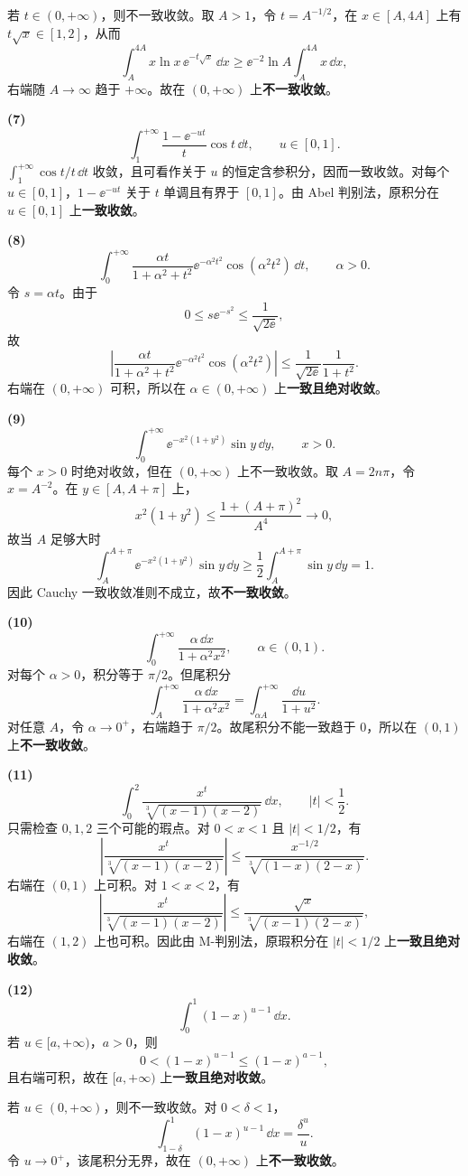 \begin{xsolution}
若 $t\in(0,+\infty)$，则不一致收敛。取 $A>1$，令 $t=A^{-1/2}$，在 $x\in[A,4A]$ 上有 $t\sqrt x\in[1,2]$，从而
\[
\int_A^{4A}x\ln x\,\ee^{-t\sqrt x}\,\dd x
\geqslant \ee^{-2}\ln A\int_A^{4A}x\,\dd x,
\]
右端随 $A\to\infty$ 趋于 $+\infty$。故在 $(0,+\infty)$ 上\textbf{不一致收敛}。

\textbf{(7)}
\[
\int_1^{+\infty}\frac{1-\ee^{-ut}}t\cos t\,\dd t,
\qquad u\in[0,1].
\]
$\int_1^{+\infty}\cos t/t\,\dd t$ 收敛，且可看作关于 $u$ 的恒定含参积分，因而一致收敛。对每个 $u\in[0,1]$，$1-\ee^{-ut}$ 关于 $t$ 单调且有界于 $[0,1]$。由 Abel 判别法，原积分在 $u\in[0,1]$ 上\textbf{一致收敛}。

\textbf{(8)}
\[
\int_0^{+\infty}\frac{\alpha t}{1+\alpha^2+t^2}
\ee^{-\alpha^2t^2}\cos(\alpha^2t^2)\,\dd t,
\qquad \alpha>0.
\]
令 $s=\alpha t$。由于
\[
0\leqslant s\ee^{-s^2}\leqslant\frac1{\sqrt{2\ee}},
\]
故
\[
\left|
\frac{\alpha t}{1+\alpha^2+t^2}
\ee^{-\alpha^2t^2}\cos(\alpha^2t^2)
\right|
\leqslant\frac1{\sqrt{2\ee}}\frac1{1+t^2}.
\]
右端在 $(0,+\infty)$ 可积，所以在 $\alpha\in(0,+\infty)$ 上\textbf{一致且绝对收敛}。

\textbf{(9)}
\[
\int_0^{+\infty}\ee^{-x^2(1+y^2)}\sin y\,\dd y,
\qquad x>0.
\]
每个 $x>0$ 时绝对收敛，但在 $(0,+\infty)$ 上不一致收敛。取 $A=2n\pi$，令 $x=A^{-2}$。在 $y\in[A,A+\pi]$ 上，
\[
x^2(1+y^2)\leqslant\frac{1+(A+\pi)^2}{A^4}\to0,
\]
故当 $A$ 足够大时
\[
\int_A^{A+\pi}\ee^{-x^2(1+y^2)}\sin y\,\dd y
\geqslant\frac12\int_A^{A+\pi}\sin y\,\dd y=1.
\]
因此 Cauchy 一致收敛准则不成立，故\textbf{不一致收敛}。

\textbf{(10)}
\[
\int_0^{+\infty}\frac{\alpha\,\dd x}{1+\alpha^2x^2},
\qquad \alpha\in(0,1).
\]
对每个 $\alpha>0$，积分等于 $\pi/2$。但尾积分
\[
\int_A^{+\infty}\frac{\alpha\,\dd x}{1+\alpha^2x^2}
=\int_{\alpha A}^{+\infty}\frac{\dd u}{1+u^2}.
\]
对任意 $A$，令 $\alpha\to0^+$，右端趋于 $\pi/2$。故尾积分不能一致趋于 $0$，所以在 $(0,1)$ 上\textbf{不一致收敛}。

\textbf{(11)}
\[
\int_0^2\frac{x^t}{\sqrt[3]{(x-1)(x-2)}}\,\dd x,
\qquad |t|<\frac12.
\]
只需检查 $0,1,2$ 三个可能的瑕点。对 $0<x<1$ 且 $|t|<1/2$，有
\[
\left|\frac{x^t}{\sqrt[3]{(x-1)(x-2)}}\right|
\leqslant
\frac{x^{-1/2}}{\sqrt[3]{(1-x)(2-x)}}.
\]
右端在 $(0,1)$ 上可积。对 $1<x<2$，有
\[
\left|\frac{x^t}{\sqrt[3]{(x-1)(x-2)}}\right|
\leqslant
\frac{\sqrt{x}}{\sqrt[3]{(x-1)(2-x)}},
\]
右端在 $(1,2)$ 上也可积。因此由 M-判别法，原瑕积分在 $|t|<1/2$ 上\textbf{一致且绝对收敛}。

\textbf{(12)}
\[
\int_0^1(1-x)^{u-1}\,\dd x.
\]
若 $u\in[a,+\infty)$，$a>0$，则
\[
0<(1-x)^{u-1}\leqslant(1-x)^{a-1},
\]
且右端可积，故在 $[a,+\infty)$ 上\textbf{一致且绝对收敛}。

若 $u\in(0,+\infty)$，则不一致收敛。对 $0<\delta<1$，
\[
\int_{1-\delta}^1(1-x)^{u-1}\,\dd x=\frac{\delta^u}{u}.
\]
令 $u\to0^+$，该尾积分无界，故在 $(0,+\infty)$ 上\textbf{不一致收敛}。
\end{xsolution}

